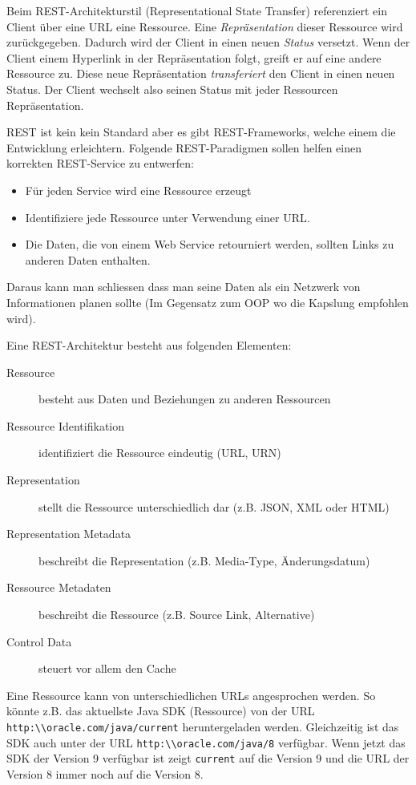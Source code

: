Beim REST-Architekturstil (Representational State Transfer) referenziert ein Client über eine URL eine Ressource. Eine \textit{Repräsentation} dieser Ressource wird zurückgegeben. Dadurch wird der Client in einen neuen \textit{Status} versetzt. Wenn der Client einem Hyperlink in der Repräsentation folgt, greift er auf eine andere Ressource zu. Diese neue Repräsentation \textit{transferiert} den Client in einen neuen Status. Der Client wechselt also seinen Status mit jeder Ressourcen Repräsentation.

REST ist kein kein Standard aber es gibt REST-Frameworks, welche einem die Entwicklung erleichtern. Folgende REST-Paradigmen sollen helfen einen korrekten REST-Service zu entwerfen:
\begin{itemize}
	\item Für jeden Service wird eine Ressource erzeugt
	\item Identifiziere jede Ressource unter Verwendung einer URL.
	\item Die Daten, die von einem Web Service retourniert werden, sollten Links zu anderen Daten enthalten.
\end{itemize}
Daraus kann man schliessen dass man seine Daten als ein Netzwerk von Informationen planen sollte (Im Gegensatz zum OOP wo die Kapslung empfohlen wird).

Eine REST-Architektur besteht aus folgenden Elementen:
\begin{description}
	\item[Ressource] besteht aus Daten und Beziehungen zu anderen Ressourcen
	\item[Ressource Identifikation] identifiziert die Ressource eindeutig (URL, URN)
	\item[Representation] stellt die Ressource unterschiedlich dar (z.B. JSON, XML oder HTML)
	\item[Representation Metadata] beschreibt die Representation (z.B. Media-Type, Änderungsdatum)
	\item[Ressource Metadaten] beschreibt die Ressource (z.B. Source Link, Alternative)
	\item[Control Data] steuert vor allem den Cache
\end{description}
Eine Ressource kann von unterschiedlichen URLs angesprochen werden. So könnte z.B. das aktuellste Java SDK (Ressource) von der URL \verb|http:\\oracle.com/java/current| heruntergeladen werden. Gleichzeitig ist das SDK auch unter der URL \verb|http:\\oracle.com/java/8| verfügbar. Wenn jetzt das SDK der Version 9 verfügbar ist zeigt \verb|current| auf die Version 9 und die URL der Version 8 immer noch auf die Version 8.

